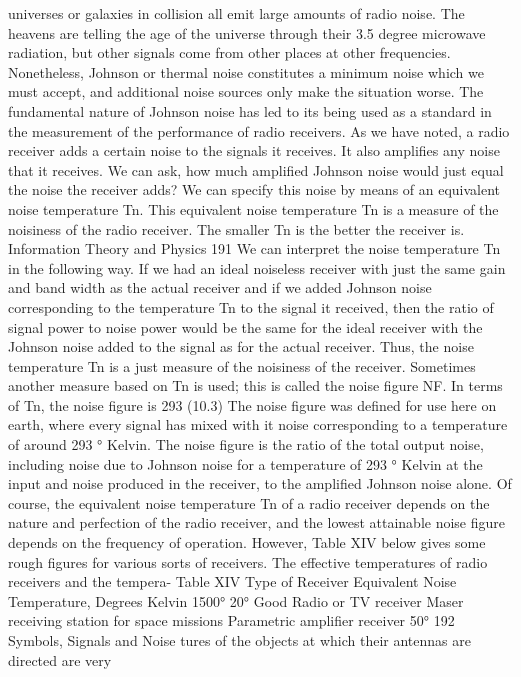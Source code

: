 {{{{{{{{{{{universes or galaxies in collision all emit large amounts of radio
noise. The heavens are telling the age of the universe through their
3.5 degree microwave radiation, but other signals come from other
places at other frequencies.
Nonetheless, Johnson or thermal noise constitutes a minimum
noise which we must accept, and additional noise sources only
make the situation worse. The fundamental nature of Johnson
noise has led to its being used as a standard in the measurement of
the performance of radio receivers.
As we have noted, a radio receiver adds a certain noise to the
signals it receives. It also amplifies any noise that it receives. We
can ask, how much amplified Johnson noise would just equal the
noise the receiver adds? We can specify this noise by means of an
equivalent noise temperature Tn. This equivalent noise temperature
Tn is a measure of the noisiness of the radio receiver. The smaller
Tn is the better the receiver is.
Information Theory and Physics 191
We can interpret the noise temperature Tn in the following way.
If we had an ideal noiseless receiver with just the same gain and
band width as the actual receiver and if we added Johnson noise
corresponding to the temperature Tn to the signal it received, then
the ratio of signal power to noise power would be the same for the
ideal receiver with the Johnson noise added to the signal as for
the actual receiver.
Thus, the noise temperature Tn is a just measure of the noisiness
of the receiver. Sometimes another measure based on Tn is used;
this is called the noise figure NF. In terms of Tn, the noise figure is
293
(10.3)
The noise figure was defined for use here on earth, where every
signal has mixed with it noise corresponding to a temperature of
around 293 ° Kelvin. The noise figure is the ratio of the total output
noise, including noise due to Johnson noise for a temperature of
293 ° Kelvin at the input and noise produced in the receiver, to the
amplified Johnson noise alone.
Of course, the equivalent noise temperature Tn of a radio receiver
depends on the nature and perfection of the radio receiver, and the
lowest attainable noise figure depends on the frequency of operation.
However, Table XIV below gives some rough figures for
various sorts of receivers.
The effective temperatures of radio receivers and the tempera-
Table XIV
Type of Receiver
Equivalent
Noise Temperature,
Degrees Kelvin
1500°
20°
Good Radio or TV receiver Maser receiving station for space missions Parametric amplifier receiver 50°
192
Symbols,
Signals and Noise
tures of the objects at which their antennas are directed are very
}}}}}}}}}}}
